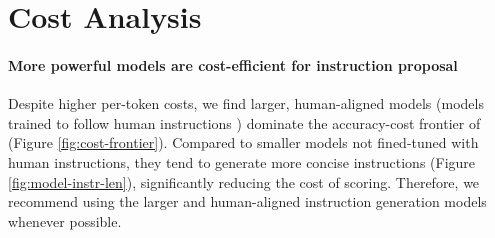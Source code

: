 \clearpage
\newpage
\section{Cost Analysis}\label{sec:cost_analysis}
\paragraph{More powerful models are cost-efficient for instruction proposal} Despite higher per-token costs, we find larger, human-aligned models (models trained to follow human instructions \citep{ouyang2022training}) dominate the accuracy-cost frontier of \algname (Figure \ref{fig:cost-frontier}). Compared to smaller models not fined-tuned with human instructions, they tend to generate more concise instructions  (Figure \ref{fig:model-instr-len}), significantly reducing the cost of \algname scoring. Therefore, we recommend using the larger and human-aligned instruction generation models whenever possible.

